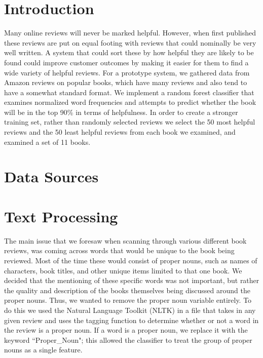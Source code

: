 \documentclass{article}
\begin{document}
\begin{multicols}{2}
\section{Introduction}
	Many online reviews will never be marked helpful. However, when first published these reviews are put on equal footing with reviews that could nominally be very well written. A system that could sort these by how helpful they are likely to be found could improve customer outcomes by making it easier for them to find a wide variety of helpful reviews. For a prototype system, we gathered data from Amazon reviews on popular books, which have many reviews and also tend to have a somewhat standard format. We implement a random forest classifier that examines normalized word frequencies and attempts to predict whether the book will be in the top 90\% in terms of helpfulness. In order to create a stronger training set, rather than randomly selected reviews we select the 50 most helpful reviews and the 50 least helpful reviews from each book we examined, and examined a set of 11
	books.

\section{Data Sources}

\section{Text Processing}

The main issue that we foresaw when scanning through various different book reviews, was coming across words that would be unique to the book being reviewed. Most of the time these would consist of proper nouns, such as names of characters, book titles, and other unique items limited to that one book. We decided that the mentioning of these specific words was not important, but rather the quality and description of the books themselves being discussed around the proper nouns. Thus, we wanted to remove the proper noun variable entirely. To do this we used the Natural Language Toolkit (NLTK) in a file that takes in any given review and uses the tagging function to determine whether or not a word in the review is a proper noun. If a word is a proper noun, we replace it with the keyword “Proper\_Noun"; this allowed the classifier to treat the group of proper nouns as a single feature. 
 

\end{multicols}
\end{document}
